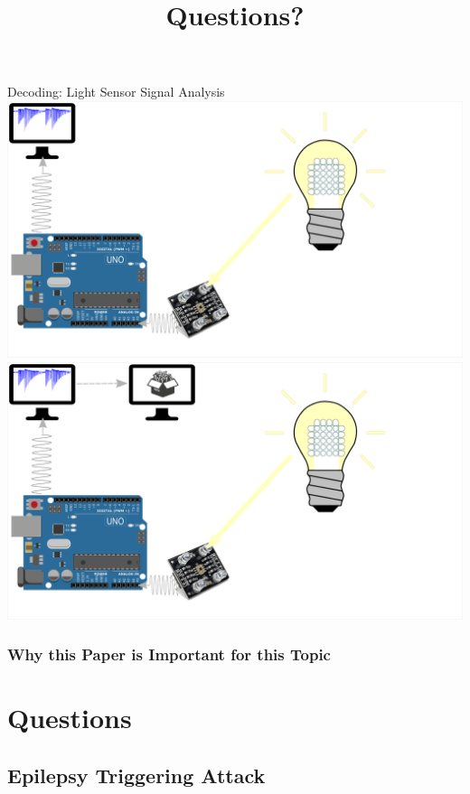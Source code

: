 \documentclass[11pt,t,usepdftitle=false,aspectratio=169]{beamer}
\begin{document}
\begin{frame}{Decoding: Light Sensor Signal Analysis}
{    }
     {
        \centering
        \includegraphics{img/Decoding_4.png}
    }
     {
        \centering
        \includegraphics{img/Decoding_5.png}
    }
\end{frame}

\subsubsection{Why this Paper is Important for this Topic}%
\label{sub:why_this_paper_is_important_for_this_topic}


\title{Questions?}
\subtitle{}
\section{Questions}


\appendix
\subsection{Epilepsy Triggering Attack}%
\label{sub:epilepsy_triggering_attack}
\end{document}
